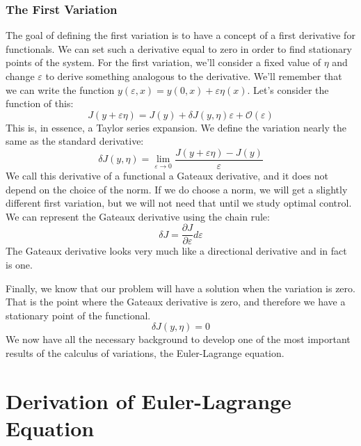 \subsubsection{The First Variation}\label{sec: first variation}
The goal of defining the first variation is to have a concept of a first derivative for functionals. We can set such a derivative equal to zero in order to find stationary points of the system. For the first variation, we'll consider a fixed value of $\eta$ and change $\varepsilon$ to derive something analogous to the derivative. We'll remember that we can write the function $y(\varepsilon,x)=y(0,x)+\varepsilon\eta(x)$. Let's consider the function of this:
$$J(y+\varepsilon\eta)=J(y)+\delta J(y,\eta)\varepsilon+\mathcal{O}(\varepsilon)$$
This is, in essence, a Taylor series expansion. We define the variation nearly the same as the standard derivative:
$$\delta J(y,\eta)=\lim_{\varepsilon\rightarrow0}\frac{J(y+\varepsilon\eta)-J(y)}{\varepsilon}$$
We call this derivative of a functional a Gateaux derivative, and it does not depend on the choice of the norm. If we do choose a norm, we will get a slightly different first variation, but we will not need that until we study optimal control. We can represent the Gateaux derivative using the chain rule:
$$\delta J=\frac{\partial J}{\partial \varepsilon}d\varepsilon$$
The Gateaux derivative looks very much like a directional derivative and in fact is one.

Finally, we know that our problem will have a solution when the variation is zero. That is the point where the Gateaux derivative is zero, and therefore we have a stationary point of the functional.
$$\delta J(y,\eta)=0$$
We now have all the necessary background to develop one of the most important results of the calculus of variations, the Euler-Lagrange equation.

\section{Derivation of Euler-Lagrange Equation} 

